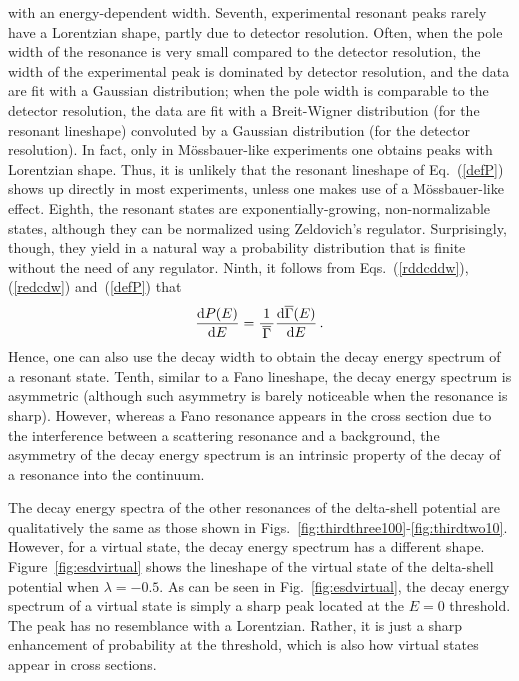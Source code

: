 \documentclass[12pt]{article}
\newcommand{\rmd}{{\rm d}}
\begin{document}
with an energy-dependent width. Seventh, experimental resonant peaks
rarely have a Lorentzian shape, partly due to detector resolution. Often,
when the pole width of the resonance is very small compared
to the detector resolution, the width of the experimental peak is dominated 
by detector resolution, and the data are fit with 
a Gaussian distribution; when the pole width is comparable to the 
detector resolution, the data are fit with a Breit-Wigner distribution
(for the resonant lineshape) convoluted by a Gaussian distribution
(for the detector resolution). In fact, only 
in M\"ossbauer-like experiments one 
obtains peaks with Lorentzian shape. Thus, it is unlikely that the resonant 
lineshape of Eq.~(\ref{defP}) shows up directly in most experiments, unless 
one makes use of a M\"ossbauer-like effect. Eighth, the resonant 
states are exponentially-growing, non-normalizable states, although 
they can be normalized using Zeldovich's regulator. Surprisingly, though, 
they yield in a natural way a probability distribution that is finite 
without the need of any regulator. Ninth, it follows from 
Eqs.~(\ref{rddcddw}), (\ref{redcdw}) and~(\ref{defP}) that
\begin{equation}
     \frac{\rmd P (E)}{\rmd E}=
\frac{1}{\, \overline{\Gamma}\, } \frac{\rmd \overline{\Gamma} (E)}{\rmd E} \, .
        \label{defPdc}
\end{equation}
Hence, one can also use the decay width to obtain the decay energy spectrum of 
a resonant state. Tenth, similar to a Fano lineshape, the decay energy 
spectrum is asymmetric (although such asymmetry is barely noticeable when
the resonance is sharp). However,
whereas a Fano resonance appears in the cross section due to the interference
between a scattering resonance and a background, the asymmetry of the decay 
energy spectrum is an intrinsic property of the decay of a resonance into
the continuum. 

The decay energy spectra of the other resonances of the delta-shell potential
are qualitatively the same as those shown in 
Figs.~\ref{fig:thirdthree100}-\ref{fig:thirdtwo10}. However, 
for a virtual state, the decay energy spectrum has a different
shape. Figure~\ref{fig:esdvirtual} shows
the lineshape of the virtual state of the delta-shell potential when
$\lambda =-0.5$. As can be seen in Fig.~\ref{fig:esdvirtual}, the decay
energy spectrum of a virtual state is simply a sharp peak
located at the $E=0$ threshold. The peak has no resemblance with a 
Lorentzian. Rather, it is just a sharp enhancement of probability at the
threshold, which is also how virtual states appear in cross sections.
\end{document}
